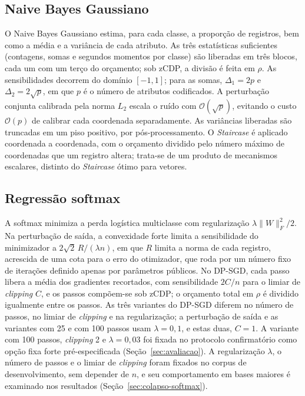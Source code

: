 \subsection{Naive Bayes Gaussiano}

O Naive Bayes Gaussiano estima, para cada classe, a proporção de registros, bem como a média e a variância de cada atributo. As três estatísticas suficientes (contagens, somas e segundos momentos por classe) são liberadas em três blocos, cada um com um terço do orçamento; sob zCDP, a divisão é feita em $\rho$. As sensibilidades decorrem do domínio $[-1, 1]$; para as somas, $\Delta_1 = 2p$ e $\Delta_2 = 2\sqrt{p}$, em que $p$ é o número de atributos codificados. A perturbação conjunta calibrada pela norma $L_2$ escala o ruído com $\mathcal{O}(\sqrt{p})$, evitando o custo $\mathcal{O}(p)$ de calibrar cada coordenada separadamente. As variâncias liberadas são truncadas em um piso positivo, por pós-processamento. O \textit{Staircase} é aplicado coordenada a coordenada, com o orçamento dividido pelo número máximo de coordenadas que um registro altera; trata-se de um produto de mecanismos escalares, distinto do \textit{Staircase} ótimo para vetores.

\subsection{Regressão softmax}

A softmax minimiza a perda logística multiclasse com regularização $\lambda \lVert W \rVert_F^2 / 2$. Na perturbação de saída, a convexidade forte limita a sensibilidade do minimizador a $2\sqrt{2}\,R/(\lambda n)$, em que $R$ limita a norma de cada registro, acrescida de uma cota para o erro do otimizador, que roda por um número fixo de iterações definido apenas por parâmetros públicos. No DP-SGD, cada passo libera a média dos gradientes recortados, com sensibilidade $2C/n$ para o limiar de \textit{clipping} $C$, e os passos compõem-se sob zCDP; o orçamento total em $\rho$ é dividido igualmente entre os passos. As três variantes do DP-SGD diferem no número de passos, no limiar de \textit{clipping} e na regularização; a perturbação de saída e as variantes com 25 e com 100 passos usam $\lambda = 0{,}1$, e estas duas, $C = 1$. A variante com 100 passos, \textit{clipping} 2 e $\lambda = 0{,}03$ foi fixada no protocolo confirmatório como opção fixa forte pré-especificada (Seção~\ref{sec:avaliacao}). A regularização $\lambda$, o número de passos e o limiar de \textit{clipping} foram fixados no corpus de desenvolvimento, sem depender de $n$, e seu comportamento em bases maiores é examinado nos resultados (Seção~\ref{sec:colapso-softmax}).


